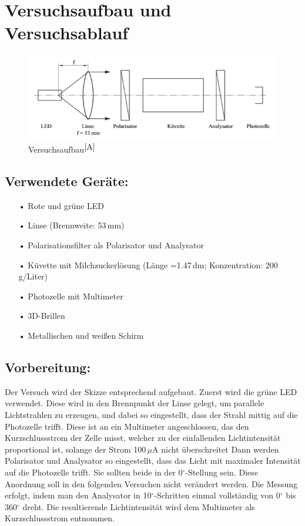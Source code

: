 \documentclass[fontsize=12pt]{scrartcl}
\begin{document}
\section{ Versuchsaufbau und Versuchsablauf}

\begin{figure}[h]
\includegraphics[scale=1]{Graphik/Versuchsaufbau}
\caption{Versuchsaufbau$^{\cite{A}}$}
\end{figure}
\subsection{Verwendete Geräte:}

\begin{itemize}
\item[•] Rote und grüne  LED
\item[•] Linse (Brennweite: 53\,mm)
\item[•] Polarisationsfilter als Polarisator und Analysator
\item[•] Küvette mit Milchzuckerlösung (Länge =1.47\,dm; Konzentration: 200\,g/Liter)
\item[•] Photozelle mit Multimeter
\item[•] 3D-Brillen
\item[•] Metallischen und weißen Schirm
\end{itemize}

\subsection{Vorbereitung:}

Der Versuch wird  der Skizze entsprechend aufgebaut. Zuerst wird die grüne LED verwendet. Diese wird in den Brennpunkt der Linse  gelegt, um parallele 
Lichtstrahlen zu erzeugen, und dabei so eingestellt, dass der Strahl mittig auf die Photozelle trifft. Diese ist an ein Multimeter angeschlossen, das den 
Kurzschlussstrom der Zelle misst, welcher zu der einfallenden Lichtintensität proportional ist, solange der Strom 100\,$\mu$A nicht überschreitet Dann 
werden Polarisator und Analysator so eingestellt, dass  das Licht mit maximaler Intensität auf die Photozelle trifft.  Sie sollten beide in der 0$^\circ$-Stellung 
sein. Diese Anordnung soll in den folgenden Versuchen nicht verändert werden. Die Messung erfolgt, indem man den Analysator in 10$^{\circ}$-Schritten 
einmal vollständig von 0$^\circ$ bis 360$^\circ$ dreht. Die resultierende Lichtintensität wird dem Multimeter als Kurzschlussstrom entnommen.
\end{document}
